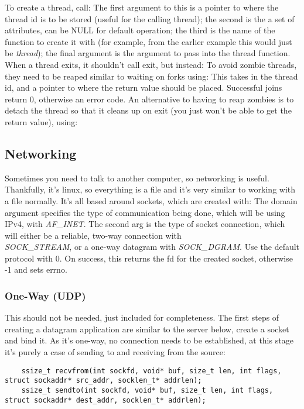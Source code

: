 \documentclass{article}
\begin{document}
To create a thread, call:
The first argument to this is a pointer to where the thread id is to be stored (useful for the calling thread); the second is the a set of attributes, can be NULL for default operation; the third is the name of the function to create it with (for example, from the earlier example this would just be \textit{thread}); the final argument is the argument to pass into the thread function. When a thread exits, it shouldn't call exit, but instead:
To avoid zombie threads, they need to be reaped similar to waiting on forks using:
This takes in the thread id, and a pointer to where the return value should be placed. Successful joins return 0, otherwise an error code. An alternative to having to reap zombies is to detach the thread so that it cleans up on exit (you just won't be able to get the return value), using:

\subsection{Networking}
Sometimes you need to talk to another computer, so networking is useful. Thankfully, it's linux, so everything is a file and it's very similar to working with a file normally. It's all based around sockets, which are created with:
The domain argument specifies the type of communication being done, which will be using IPv4, with \textit{AF\_INET}. The second arg is the type of socket connection, which will either be a reliable, two-way connection with \\\textit{SOCK\_STREAM}, or a one-way datagram with \textit{SOCK\_DGRAM}. Use the default protocol with 0. On success, this returns the fd for the created socket, otherwise -1 and sets errno.

\subsubsection{One-Way (UDP)}
This should not be needed, just included for completeness. The first steps of creating a datagram application are similar to the server below, create a socket and bind it. As it's one-way, no connection needs to be established, at this stage it's purely a case of sending to and receiving from the source:
\begin{verbatim}
    ssize_t recvfrom(int sockfd, void* buf, size_t len, int flags, struct sockaddr* src_addr, socklen_t* addrlen);
    ssize_t sendto(int sockfd, void* buf, size_t len, int flags, struct sockaddr* dest_addr, socklen_t* addrlen);
\end{verbatim}
\end{document}
